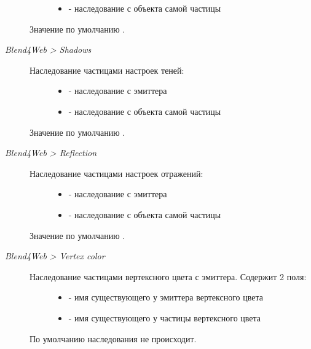 \documentclass[a4paper,12pt,oneside]{sphinxmanual}
\begin{document}
\begin{description}
\begin{description}
\begin{itemize}
\item {} 
 - наследование с объекта самой частицы

\end{itemize}

\end{description}

Значение по умолчанию .

\item[{\emph{Blend4Web \textgreater{} Shadows}}] \leavevmode\begin{description}
\item[{Наследование частицами настроек теней:}] \leavevmode\begin{itemize}
\item {} 
 - наследование с эмиттера

\item {} 
 - наследование с объекта самой частицы

\end{itemize}

\end{description}

Значение по умолчанию .

\item[{\emph{Blend4Web \textgreater{} Reflection}}] \leavevmode\begin{description}
\item[{Наследование частицами настроек отражений:}] \leavevmode\begin{itemize}
\item {} 
 - наследование с эмиттера

\item {} 
 - наследование с объекта самой частицы

\end{itemize}

\end{description}

Значение по умолчанию .

\item[{\emph{Blend4Web \textgreater{} Vertex color}}] \leavevmode\begin{description}
\item[{Наследование частицами вертексного цвета с эмиттера. Содержит 2 поля:}] \leavevmode\begin{itemize}
\item {} 
 - имя существующего у эмиттера вертексного цвета

\item {} 
 - имя существующего у частицы вертексного цвета

\end{itemize}

\end{description}

По умолчанию наследования не происходит.

\end{description}
\end{document}
